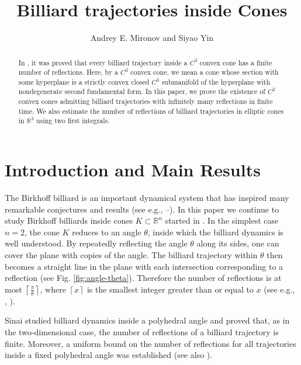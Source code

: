 \documentclass[12pt]{article}
\begin{document}
\title{Billiard trajectories inside Cones}

\author {Andrey E. Mironov and Siyao Yin}

\date{}
\maketitle

\sloppy
\begin{abstract}
  In \cite{MY}, it was proved that every billiard trajectory inside a $C^3$ convex cone has a finite number of reflections. 
  Here, by a $C^3$ convex cone, we mean a cone whose section with some hyperplane is a strictly convex closed $C^3$ submanifold of the hyperplane with nondegenerate second fundamental form.
    In this paper, 
  we prove the existence of $C^2$ convex cones admitting billiard trajectories with infinitely many reflections in finite time.
  We also estimate the number of reflections of billiard trajectories in elliptic cones in $\mathbb{R}^3$
  using two first integrals.
\end{abstract}

\tableofcontents
  
\section{Introduction and Main Results}
The Birkhoff billiard is an important dynamical system that has inspired many remarkable conjectures and results (see e.g., \cite{Bir}--\cite{Bol}).
In this paper we continue to study Birkhoff billiards inside cones $K \subset \mathbb{R}^n$ started in \cite{MY}. 
In the simplest case $n=2$, the cone $K$ reduces to an angle $\theta$, inside which 
the billiard dynamics is well understood.
By repeatedly reflecting the angle $\theta$ along its sides, one can cover the plane with copies of the angle. The billiard trajectory within $\theta$ then becomes a straight line in the plane with each intersection corresponding to a reflection (see Fig. \ref{fig:angle-theta}).  
Therefore the number of reflections is at most $\left\lceil \frac{\pi}{\theta} \right\rceil$, where $\left\lceil x \right\rceil$ is the smallest integer greater than or equal to $x$ (see e.g., \cite{Tab}, \cite{Gal}).  

Sinai \cite{Sin} studied billiard dynamics inside a polyhedral angle and proved that, as in the two-dimensional case, the number of reflections of a billiard trajectory is finite.  
Moreover, a uniform bound on the number of reflections for all trajectories inside a fixed polyhedral angle was established (see also \cite{Sev}).
\end{document}
